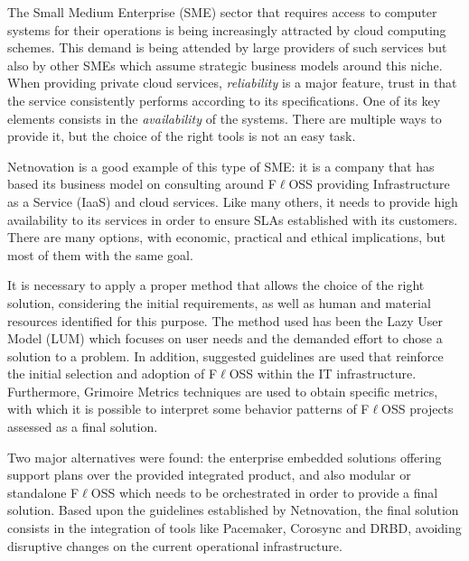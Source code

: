 \documentclass[a4paper, 12pt]{book}
\begin{document}

\noindent The Small Medium Enterprise (SME) sector that requires access to computer systems for their operations is being increasingly attracted by cloud computing schemes. This demand is being attended by large providers of such services but also by other SMEs which assume strategic business models around this niche. When providing private cloud services, \textit{reliability} is a major feature, trust in that the service consistently performs according to its specifications. One of its key elements consists in the \textit{availability} of the systems. There are multiple ways to provide it, but the choice of the right tools is not an easy task.\bigskip

\noindent Netnovation is a good example of this type of SME: it is a company that has based its business model on consulting around F$\ell$OSS providing Infrastructure as a Service (IaaS) and cloud services. Like many others, it needs to provide high availability to its services in order to ensure SLAs established with its customers. There are many options, with economic, practical and ethical implications, but most of them with the same goal.\bigskip


\noindent It is necessary to apply a proper method that allows the choice of the right solution, considering the initial requirements, as well as human and material resources identified for this purpose. The method used has been the Lazy User Model (LUM) which focuses on user needs and the demanded effort to chose a solution to a problem. In addition,
 suggested guidelines are used that reinforce the initial selection and adoption of F$\ell$OSS within the IT infrastructure. Furthermore, Grimoire Metrics techniques are used to obtain specific metrics, with which it is possible to interpret some behavior patterns of F$\ell$OSS projects assessed as a final solution.\bigskip


\noindent Two major alternatives were found: the enterprise embedded solutions offering support plans over the provided integrated product, and also modular or standalone F$\ell$OSS which needs to be orchestrated in order to provide a final solution. Based upon the guidelines established by Netnovation, the final solution consists in the integration of tools like Pacemaker, Corosync and DRBD, avoiding disruptive changes on the current operational infrastructure.\bigskip
\end{document}
